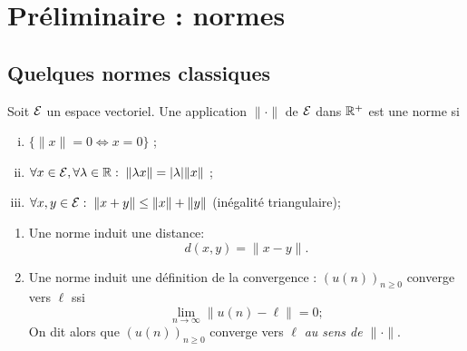 \section{Préliminaire : normes} \label{sec:Multivar-Norme}

\subsection{Quelques normes classiques} 

\begin{definition}[Norme]
  Soit $\mathcal{E}$ un espace vectoriel. Une application $\|\cdot\|$ de $\mathcal{E}$ dans $\mathbb{R}^+$ est une norme si
  \begin{enumerate}[(i)]
    \item $\{\|x\| = 0 \Leftrightarrow x = 0\}$ ;
    \item $\forall x \in \mathcal{E}, \forall \lambda \in \mathbb{R}: \; \|\lambda x\| = |\lambda| \|x\|$ ;
    \item $\forall x, y \in \mathcal{E}: \; \|x+y\| \leq \|x\| + \|y\|$ (inégalité triangulaire);
  \end{enumerate}
\end{definition}

\remarks
\begin{enumerate}
  \item Une norme induit une distance:
  $$
  d(x, y) = \|x - y\|.
  $$
  \item Une norme induit une définition de la convergence : $(u(n))_{n \geq 0}$ converge vers $\ell$ ssi
  $$
  \lim_{n \to \infty} \|u(n) - \ell\| = 0;
  $$
  On dit alors que $(u(n))_{n \geq 0}$ converge vers $\ell$ {\em au sens de $\|\cdot\|$}.
\end{enumerate}


